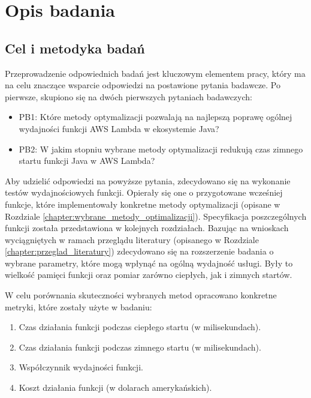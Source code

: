 \chapter{Opis badania}\label{chapter:opis_badania}

\section{Cel i metodyka badań}\label{chapter:cel_i_metodyka_badan}

Przeprowadzenie odpowiednich badań jest kluczowym elementem pracy, który ma na celu znaczące wsparcie odpowiedzi na postawione pytania badawcze.
Po pierwsze, skupiono się na dwóch pierwszych pytaniach badawczych:
\begin{itemize}
    \item PB1: Które metody optymalizacji pozwalają na najlepszą poprawę ogólnej wydajności funkcji AWS Lambda w ekosystemie Java?
    \item PB2: W jakim stopniu wybrane metody optymalizacji redukują czas zimnego startu funkcji Java w AWS Lambda?
\end{itemize}
Aby udzielić odpowiedzi na powyższe pytania, zdecydowano się na wykonanie testów wydajnościowych funkcji.
Opierały się one o przygotowane wcześniej funkcje, które implementowały konkretne metody optymalizacji (opisane w Rozdziale \ref{chapter:wybrane_metody_optimalizacji}).
Specyfikacja poszczególnych funkcji została przedstawiona w kolejnych rozdziałach.
Bazując na wnioskach wyciągniętych w ramach przeglądu literatury (opisanego w Rozdziale \ref{chapter:przeglad_literatury}) zdecydowano się na rozszerzenie badania o wybrane parametry, które mogą wpłynąć na ogólną wydajność usługi.
Były to wielkość pamięci funkcji oraz pomiar zarówno ciepłych, jak i zimnych startów.  

W celu porównania skuteczności wybranych metod opracowano konkretne metryki, które zostały użyte w badaniu:
\begin{enumerate}
    \item Czas działania funkcji podczas ciepłego startu (w milisekundach).
    \item Czas działania funkcji podczas zimnego startu (w milisekundach).
    \item Współczynnik wydajności funkcji.
    \item Koszt działania funkcji (w dolarach amerykańskich).
\end{enumerate}

